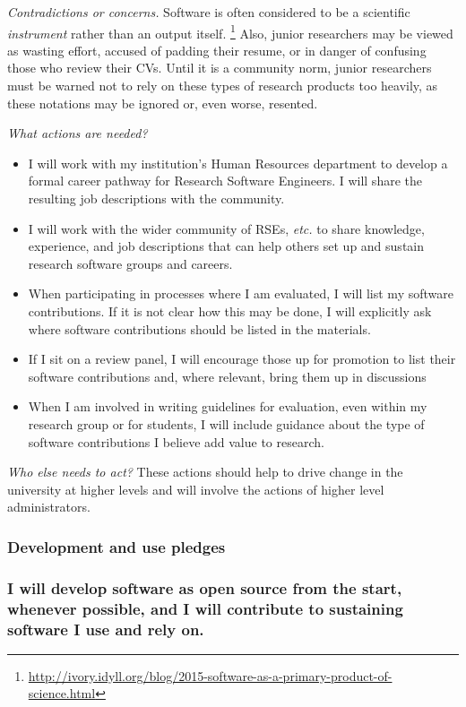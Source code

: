 \documentclass[a4paper,UKenglish]{dagman}
\renewcommand{\paragraph}[1]{\subsubsection*{#1}\xspace}
\newcommand{\etc}{\emph{etc.}\xspace}
\begin{document}
\emph{Contradictions or concerns.}
Software is often considered to be a scientific \emph{instrument} rather than an output itself.%
\footnote{\url{http://ivory.idyll.org/blog/2015-software-as-a-primary-product-of-science.html}}
Also, junior researchers may be viewed as wasting effort, accused of padding their resume, or in danger of confusing those who review their CVs. Until it is a community norm, junior researchers must be warned not to rely on these types of research products too heavily, as these notations may be ignored or, even worse, resented.


\emph{What actions are needed?}
\begin{itemize}
\item I will work with my institution's Human Resources department to develop a formal career pathway for Research Software Engineers. I will share the resulting job descriptions with the community.
\item I will work with the wider community of RSEs, \etc to share knowledge, experience, and job descriptions that can help others set up and sustain research software groups and careers.
\item When participating in processes where I am evaluated, I will list my software contributions.
If it is not clear how this may be done, I will explicitly ask where software contributions should be listed in the materials.
\item If I sit on a review panel, I will encourage those up for promotion to list their software contributions and, where relevant, bring them up in discussions
\item When I am involved in writing guidelines for evaluation, even within my research group or for students, I will include guidance about the type of software contributions I believe add value to research.
\end{itemize}

\emph{Who else needs to act?}
These actions should help to drive change in the university at higher levels and will involve the actions of higher level administrators.

\subsubsection*{Development and use pledges}

\paragraph{I will develop software as open source from the start, whenever possible, and I will contribute to sustaining software I use and rely on.}
\end{document}
